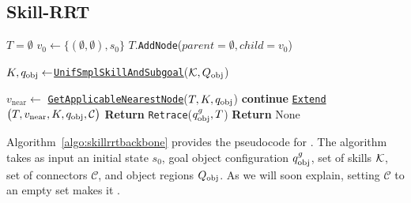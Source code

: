 

\subsection{Skill-RRT}
\newcommand{\extend}{\texttt{Extend}}
\newcommand{\connectorskillset}{\mathcal{C}}

\begin{algorithm}[h]
\caption{\skillrrt($s_0, \qobj^g, \skillset, \connectorskillset,\Qobj$)}
\label{algo:skill-rrt}
\begin{algorithmic}[1]
\State $T=\emptyset$   
\State $v_{0} \gets \{(\emptyset, \emptyset), s_0\}$ 
\State $T$.\texttt{AddNode}($parent=\emptyset, child=v_{0}$)

    \State ${K}, q_\text{obj} \gets $\hyperref[algo:UnifSmplSkillAndSubgoal]{\texttt{UnifSmplSkillAndSubgoal}}($\mathcal{K},Q_\text{obj}$)

    \State ${v}_{\text{near}} \gets$ \hyperref[algo:GetFeasibleNearestNode]{\texttt{GetApplicableNearestNode}}($T, K, q_\text{obj}$)
        \State \textbf{continue}
    \EndIf
    \State \hyperref[algo:extend]{\texttt{Extend}}$\big(T, v_{\text{near}}, K, \qobj, \connectorskillset\big)$
        \State \textbf{Return} \texttt{Retrace}($q_\text{obj}^g, T$)
    \EndIf
\EndFor
\State \textbf{Return} None

\end{algorithmic}
\label{algo:skillrrtbackbone}
\end{algorithm}
Algorithm~\ref{algo:skillrrtbackbone} provides the pseudocode for \skillrrt. The algorithm takes as input an initial state $s_0$, goal object configuration $q_\text{obj}^g$, set of skills $\mathcal{K}$, set of connectors $\connectorskillset$, and object regions $Q_\text{obj}$. As we will soon explain, setting $\connectorskillset$ to an empty set makes it \lazyskillrrt.

